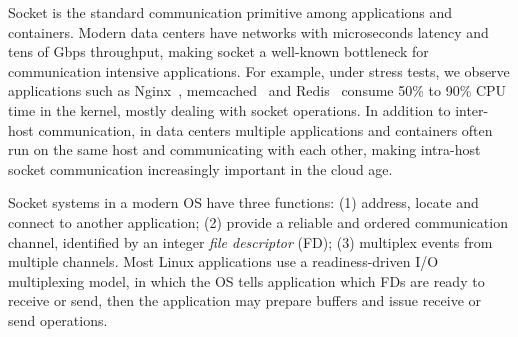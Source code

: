 Socket is the standard communication primitive among applications and containers.
Modern data centers have networks with microseconds latency and tens of Gbps throughput, making socket a well-known bottleneck for communication intensive applications.
For example, under stress tests, we observe applications such as Nginx~\cite{reese2008nginx}, memcached~\cite{fitzpatrick2004distributed} and Redis~\cite{carlson2013redis} consume 50\% to 90\% CPU time in the kernel, mostly dealing with socket operations.
In addition to inter-host communication, in data centers multiple applications and containers often run on the same host and communicating with each other, making intra-host socket communication increasingly important in the cloud age.

Socket systems in a modern OS have three functions:
(1) address, locate and connect to another application;%
(2) provide a reliable and ordered communication channel, identified by an integer \emph{file descriptor} (FD);
(3) multiplex events from multiple channels.
Most Linux applications use a readiness-driven I/O multiplexing model, in which the OS tells application which FDs are ready to receive or send, then the application may prepare buffers and issue receive or send operations.



